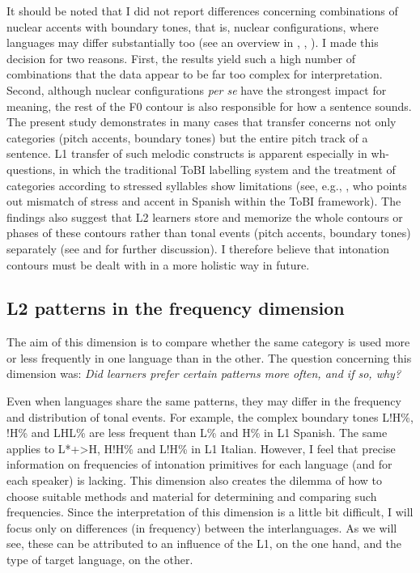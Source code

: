 It should be noted that I did not report differences concerning combinations of nuclear accents with boundary tones, that is, nuclear configurations, where languages may differ substantially too (see an overview in , , ). I made this decision for two reasons. First, the results yield such a high number of combinations that the data appear to be far too complex for interpretation. Second, although nuclear configurations \textit{per se} have the strongest impact for meaning, the rest of the F0 contour is also responsible for how a sentence sounds. The present study demonstrates in many cases that transfer concerns not only categories (pitch accents, boundary tones) but the entire pitch track of a sentence. L1 transfer of such melodic constructs is apparent especially in wh-questions, in which the traditional ToBI labelling system and the treatment of categories according to stressed syllables show limitations (see, e.g., \citealt{Kimura2006}, who points out mismatch of stress and accent in Spanish within the ToBI framework). The findings also suggest that L2 learners store and memorize the whole contours or phases of these contours rather than tonal events (pitch accents, boundary tones) separately (see \citealt{TorreiraGrice2018} and \citealt{Pešková2021} for further discussion). I therefore believe that intonation contours must be dealt with in a more holistic way in future.


\subsection{L2 patterns in the frequency dimension}\label{sec:5.3.4}

The aim of this dimension is to compare whether the same category is used more or less frequently in one language than in the other. The question concerning this dimension was: \textit{Did learners prefer certain patterns more often, and if so, why?}


Even when languages share the same patterns, they may differ in the frequency and distribution of tonal events. For example, the complex boundary tones L!H\%, !H\% and LHL\% are less frequent than L\% and H\% in L1 Spanish. The same applies to L*+>H, H!H\% and L!H\% in L1 Italian. However, I feel that precise information on frequencies of intonation primitives for each language (and for each speaker) is lacking. This dimension also creates the dilemma of how to choose suitable methods and material for determining and comparing such frequencies. Since the interpretation of this dimension is a little bit difficult, I will focus only on differences (in frequency) between the interlanguages. As we will see, these can be attributed to an influence of the L1, on the one hand, and the type of target language, on the other.



